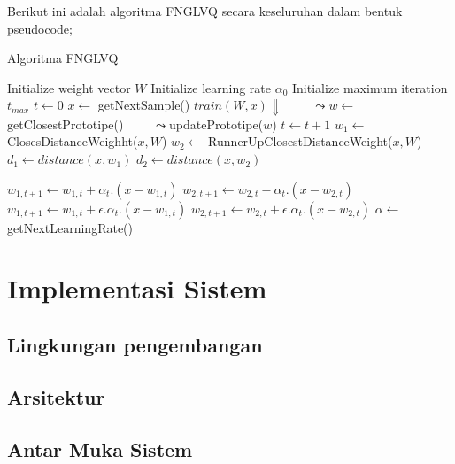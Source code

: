 \noindent Berikut ini adalah algoritma FNGLVQ secara keseluruhan dalam bentuk
pseudocode;

\begin{algorithm}  
\scriptsize 
\caption{Algoritma FNGLVQ}          
\label{alg:lvq3}                           
\begin{algorithmic}                    %
	\STATE Initialize weight vector $W$
	\STATE Initialize learning rate $\alpha_0$
	\STATE Initialize maximum iteration $t_{max}$
	\STATE $t \leftarrow 0$
		\STATE $x \leftarrow $ getNextSample()
		\STATE $train(W, x) \Downarrow$
		\STATE $\qquad \leadsto w \leftarrow $ getClosestPrototipe()
		\STATE $\qquad \leadsto $updatePrototipe($w$)
		\STATE $t \leftarrow t + 1$
	\ENDWHILE
	\STATE $w_1 \leftarrow $ ClosesDistanceWeighht($x, W$)
	\STATE $w_2 \leftarrow $ RunnerUpClosestDistanceWeight($x, W$)
	\STATE $d_1 \leftarrow distance(x, w_1)$
	\STATE $d_2 \leftarrow distance(x, w_2)$
	
			\STATE $w_{1,t+1} \leftarrow w_{1,t} + \alpha_t . (x - w_{1,t})$
			\STATE $w_{2,t+1} \leftarrow w_{2,t} - \alpha_t . (x - w_{2,t})$
		\ENDIF
	\ELSE
		\STATE $w_{1,t+1} \leftarrow w_{1,t} + \epsilon.\alpha_t . (x - w_{1,t})$
		\STATE $w_{2,t+1} \leftarrow w_{2,t} + \epsilon.\alpha_t . (x - w_{2,t})$
	\ENDIF
	\STATE $\alpha \leftarrow $ getNextLearningRate()
\end{algorithmic}
\end{algorithm}  

\section{Implementasi Sistem}
\subsection{Lingkungan pengembangan}

\subsection{Arsitektur}

\subsection{Antar Muka Sistem}
